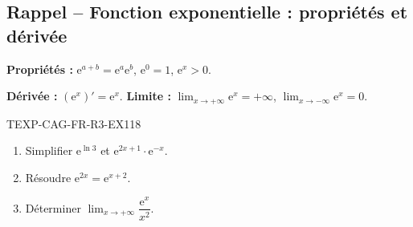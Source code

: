 

\subsection*{Rappel -- Fonction exponentielle : propriétés et dérivée}

\textbf{Propriétés :} $\mathrm{e}^{a+b} = \mathrm{e}^a \mathrm{e}^b$, $\mathrm{e}^0 = 1$, $\mathrm{e}^x > 0$.

\textbf{Dérivée :} $(\mathrm{e}^x)' = \mathrm{e}^x$. \textbf{Limite :} $\lim_{x \to +\infty} \mathrm{e}^x = +\infty$, $\lim_{x \to -\infty} \mathrm{e}^x = 0$.

\begin{exercice}{TEXP-CAG-FR-R3-EX1}{1}{8}
\begin{enumerate}
  \item Simplifier $\mathrm{e}^{\ln 3}$ et $\mathrm{e}^{2x + 1} \cdot \mathrm{e}^{-x}$.
  \item Résoudre $\mathrm{e}^{2x} = \mathrm{e}^{x+2}$.
  \item Déterminer $\lim_{x \to +\infty} \dfrac{\mathrm{e}^x}{x^2}$.
\end{enumerate}
\end{exercice}

